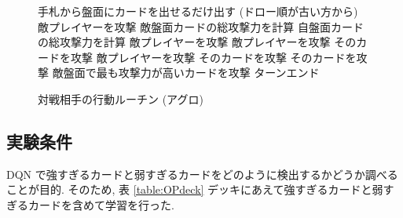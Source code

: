 \documentclass{jarticle}     %
\begin{document}
\begin{figure}[ht]
  \vspace{-0.3cm}
  \begin{algorithm}[H]
    \small
      \caption{
        対戦相手の行動ルーチン (アグロ)
        }
      \label{aguro}
      \begin{algorithmic}[1] 
      \STATE 手札から盤面にカードを出せるだけ出す (ドロー順が古い方から)
      \STATE 敵プレイヤーを攻撃
      \ELSE
      \STATE 敵盤面カードの総攻撃力を計算
      \STATE 自盤面カードの総攻撃力を計算
      \STATE 敵プレイヤーを攻撃
      \ENDIF 
      \STATE  敵プレイヤーを攻撃
      \ENDIF
      \STATE そのカードを攻撃
      \ELSE
      \STATE 敵プレイヤーを攻撃
      \ENDIF
      \ENDIF
      \STATE そのカードを攻撃
      \ELSE
      \STATE そのカードを攻撃
      \ELSE 
      \STATE 敵盤面で最も攻撃力が高いカードを攻撃
      \ENDIF
      \ENDIF
      \ENDIF
      \ENDIF
      \ENDFOR
      \STATE ターンエンド
      \end{algorithmic}
  \end{algorithm}
  \vspace{-0.3cm}
  \end{figure}

\subsection{実験条件}
DQN で強すぎるカードと弱すぎるカードをどのように検出するかどうか調べることが目的.
そのため, 表 \ref{table:OPdeck} デッキにあえて強すぎるカードと弱すぎるカードを含めて学習を行った.
\end{document}
